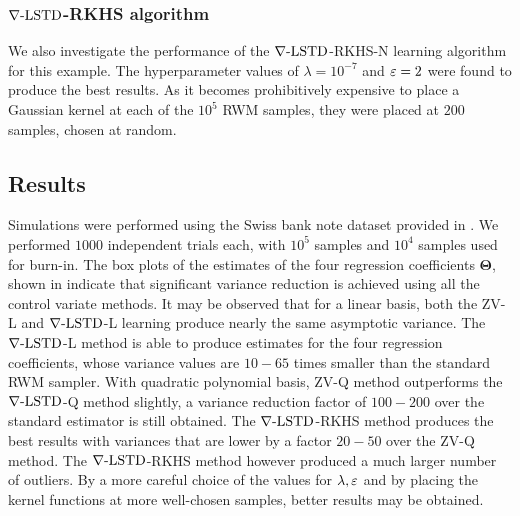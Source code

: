\noindent \subsubsection*{$\nabla\text{-LSTD}$-RKHS algorithm}
We also investigate the performance of the $\nabla\text{-LSTD}$-RKHS-N learning algorithm for this example.  The hyperparameter values of $\lambda = 10^{-7}$ and $\varepsilon = 2$ were found to produce the best results.  As it becomes prohibitively expensive to place a Gaussian kernel at each of the $10^5$ RWM samples, they were placed at $200$ samples, chosen at random.
\noindent \subsection*{Results}
Simulations were performed using the Swiss bank note dataset provided in \cite{papmirgir14}. We performed $1000$ independent trials each, with  $10^5$ samples and $10^4$ samples used for burn-in. The box plots of the estimates of the four regression coefficients $\boldsymbol{\Theta}$, shown in  indicate that significant variance reduction is  achieved using all the control variate methods. It may be observed that for a linear basis, both the ZV-L and $\nabla\text{-LSTD}$-L learning produce nearly the same asymptotic variance. The $\nabla\text{-LSTD}$-L method is able to produce estimates for the four regression coefficients, whose variance values are $10-65$ times smaller than the standard RWM sampler. With quadratic polynomial basis, ZV-Q method outperforms the $\nabla\text{-LSTD}$-Q method slightly, a variance reduction factor of $100-200$ over the standard estimator is still obtained. The $\nabla\text{-LSTD}$-RKHS method produces the best results with variances that are lower by a factor $20-50$ over the ZV-Q method. The $\nabla\text{-LSTD}$-RKHS method however produced a much larger number of outliers. By a more careful choice of the values for $\lambda,\varepsilon$ and by placing the kernel functions at more well-chosen samples, better results may be obtained.

